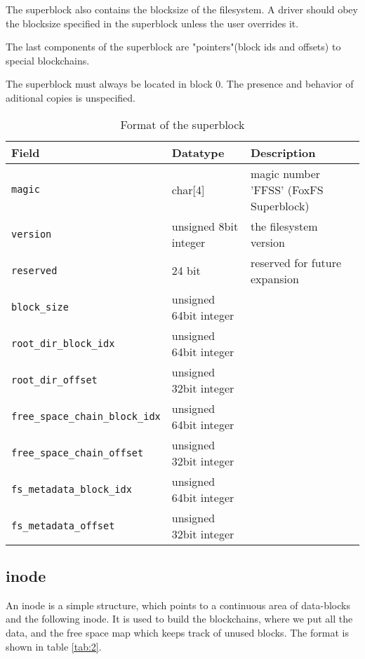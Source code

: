 \documentclass[a4paper,12pt]{article}
\begin{document}
			The superblock also contains the blocksize of the filesystem. A driver should obey the blocksize specified in the superblock unless the user overrides it.

			The last components of the superblock are "pointers"(block ids and offsets) to special blockchains.

			The superblock must always be located in block 0. The presence and behavior of aditional copies is unspecified.

			\begin{table}[ht]
				\caption{Format of the superblock}\label{tab:0}
				\begin{tabularx}{\linewidth}{|l|l|X|} \hline
					\textbf{Field} 					& \textbf{Datatype} 		& \textbf{Description} \\ \hline
					\verb|magic| 				& char[4] 	& magic number 'FFSS' (FoxFS Superblock) \\ \hline
					\verb|version| 				& unsigned 8bit integer 	& the filesystem version \\ \hline
					\verb|reserved| 	& 24 bit 	& reserved for future expansion \\ \hline
					\verb|block_size| 		& unsigned 64bit integer	&  \\ \hline
					\verb|root_dir_block_idx|					& unsigned 64bit integer					&  \\ \hline
					\verb|root_dir_offset|					& unsigned 32bit integer				&  \\ \hline
					\verb|free_space_chain_block_idx|					& unsigned 64bit integer					&  \\ \hline
					\verb|free_space_chain_offset|					& unsigned 32bit integer				&  \\ \hline
					\verb|fs_metadata_block_idx|					& unsigned 64bit integer					&  \\ \hline
					\verb|fs_metadata_offset|					& unsigned 32bit integer				&  \\ \hline

				\end{tabularx}
			\end{table}

 		\subsection{inode}
			An inode is a simple structure, which points to a continuous area of data-blocks and the following inode. It is used to build the blockchains, where we put all the data, and the free space map which keeps track of unused blocks. The format is shown in table \ref{tab:2}.
			
\end{document}
